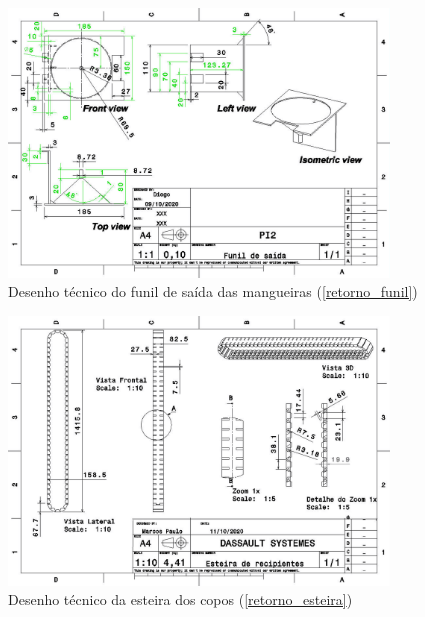 \begin{apendicesenv}
\begin{figure}[H]
    \centering
    \includegraphics[width=0.9\textwidth]{figuras/estrutura/Desenhos/Drawing1_FunildeSaida.jpg}
    \caption{Desenho técnico do funil de saída das mangueiras (\ref{retorno_funil})}
    \label{fig:funil}
\end{figure}

\begin{figure}[H]
    \centering
    \includegraphics[width=0.9\textwidth]{figuras/estrutura/Desenhos/Esteira.jpg}
    \caption{Desenho técnico da esteira dos copos (\ref{retorno_esteira})}
    \label{fig:esteira}
\end{figure}


\end{apendicesenv}
